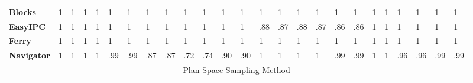 \documentclass[letterpaper]{article}
\theoremstyle{plain}
\begin{document}
\begin{table}[tb]
{\begin{tabular}{|l|llllll|llllll|llllll|llllll|}
\textbf{Blocks}              & 1                       & \multicolumn{1}{l|}{1}   & 1                       & \multicolumn{1}{l|}{1}   & 1                       & 1     & 1                       & \multicolumn{1}{l|}{1}   & 1                       & \multicolumn{1}{l|}{1}   & 1                       & 1   & 1                       & \multicolumn{1}{l|}{1}   & 1                       & \multicolumn{1}{l|}{1}   & 1                       & 1   & 1                       & \multicolumn{1}{l|}{1}    & 1                       & \multicolumn{1}{l|}{1}    & 1                       & 1    \\ \cline{1-1}
\textbf{EasyIPC}             & 1                       & \multicolumn{1}{l|}{1}   & 1                       & \multicolumn{1}{l|}{1}   & 1                       & 1     & 1                       & \multicolumn{1}{l|}{1}   & 1                       & \multicolumn{1}{l|}{1}   & 1                       & 1   & .88                     & \multicolumn{1}{l|}{.87} & .88                     & \multicolumn{1}{l|}{.87} & .86                     & .86 & 1                       & \multicolumn{1}{l|}{1}    & 1                       & \multicolumn{1}{l|}{1}    & 1                       & 1    \\ \cline{1-1}
\textbf{Ferry}               & 1                       & \multicolumn{1}{l|}{1}   & 1                       & \multicolumn{1}{l|}{1}   & 1                       & 1     & 1                       & \multicolumn{1}{l|}{1}   & 1                       & \multicolumn{1}{l|}{1}   & 1                       & 1   & 1                       & \multicolumn{1}{l|}{1}   & 1                       & \multicolumn{1}{l|}{1}   & 1                       & 1   & 1                       & \multicolumn{1}{l|}{1}    & 1                       & \multicolumn{1}{l|}{1}    & 1                       & 1    \\ \cline{1-1}
\textbf{Navigator}           & 1                       & \multicolumn{1}{l|}{1}   & 1                       & \multicolumn{1}{l|}{1}   & .99                     & .99   & .87                     & \multicolumn{1}{l|}{.87} & .72                     & \multicolumn{1}{l|}{.74} & .90                     & .90 & 1                       & \multicolumn{1}{l|}{1}   & 1                       & \multicolumn{1}{l|}{1}   & .99                     & .99 & 1                       & \multicolumn{1}{l|}{1}    & .96                     & \multicolumn{1}{l|}{.96}  & .99                     & .99  \\ \hline
\multicolumn{25}{|c|}{Plan Space Sampling Method}                                                                                                                                                                                                                                                                                                                                                                                                                                                                                                                                                                                      \\ \hline

\end{tabular}}
\end{table}
\end{document}
